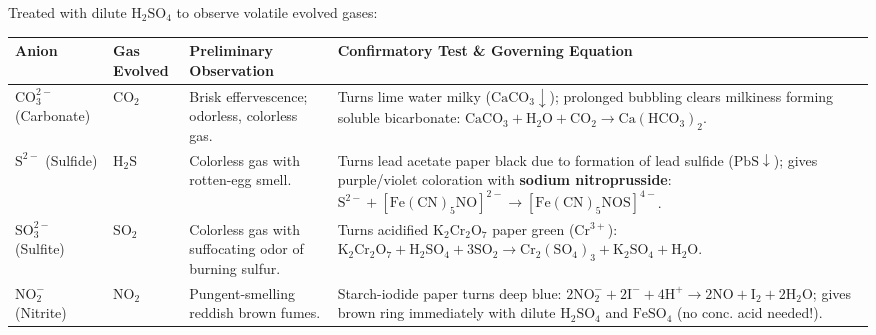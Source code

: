 \documentclass[10pt,a4paper]{article}
\begin{document}
\begin{conceptbox}
Treated with dilute $\mathrm{H_2SO_4}$ to observe volatile evolved gases:
\begin{center}
\scriptsize
\begin{tabular}{|p{2.2cm}|p{1.2cm}|p{3.4cm}|p{7.2cm}|}
\hline
\textbf{Anion} & \textbf{Gas Evolved} & \textbf{Preliminary Observation} & \textbf{Confirmatory Test \& Governing Equation} \\
\hline
$\mathrm{CO_3^{2-}}$ (Carbonate) & $\mathrm{CO_2}$ & Brisk effervescence; odorless, colorless gas. & Turns lime water milky ($\mathrm{CaCO}_3 \downarrow$); prolonged bubbling clears milkiness forming soluble bicarbonate: $\mathrm{CaCO_3} + \mathrm{H_2O} + \mathrm{CO_2} \to \mathrm{Ca(HCO_3)_2}$. \\
\hline
$\mathrm{S^{2-}}$ (Sulfide) & $\mathrm{H_2S}$ & Colorless gas with rotten-egg smell. & Turns lead acetate paper black due to formation of lead sulfide ($\mathrm{PbS} \downarrow$); gives purple/violet coloration with \textbf{sodium nitroprusside}: $\mathrm{S^{2-}} + [\mathrm{Fe(CN)_5NO}]^{2-} \to [\mathrm{Fe(CN)_5NOS}]^{4-}$. \\
\hline
$\mathrm{SO_3^{2-}}$ (Sulfite) & $\mathrm{SO_2}$ & Colorless gas with suffocating odor of burning sulfur. & Turns acidified $\mathrm{K_2Cr_2O_7}$ paper green ($\mathrm{Cr^{3+}}$): $\mathrm{K_2Cr_2O_7} + \mathrm{H_2SO_4} + 3\mathrm{SO_2} \to \mathrm{Cr_2(SO_4)_3} + \mathrm{K_2SO_4} + \mathrm{H_2O}$. \\
\hline
$\mathrm{NO_2^-}$ (Nitrite) & $\mathrm{NO_2}$ & Pungent-smelling reddish brown fumes. & Starch-iodide paper turns deep blue: $2\mathrm{NO_2^-} + 2\mathrm{I^-} + 4\mathrm{H}^+ \to 2\mathrm{NO} + \mathrm{I_2} + 2\mathrm{H_2O}$; gives brown ring immediately with dilute $\mathrm{H_2SO_4}$ and $\mathrm{FeSO_4}$ (no conc. acid needed!). \\
\hline
\end{tabular}
\end{center}
\end{conceptbox}
\end{document}
